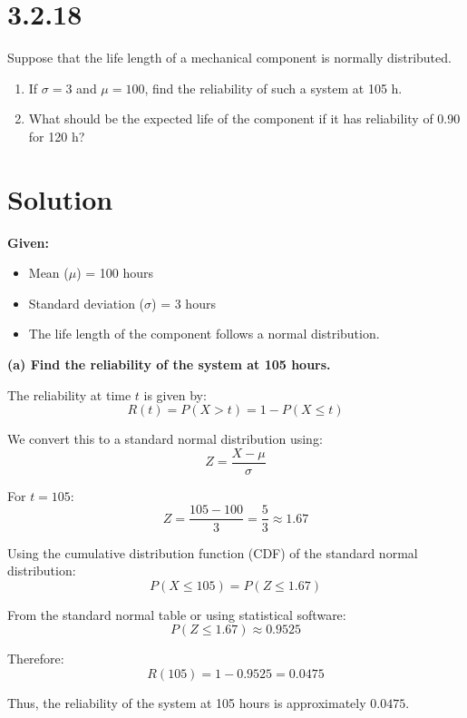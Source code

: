 \documentclass{article}
\begin{document}
\section*{3.2.18}

Suppose that the life length of a mechanical component is normally distributed.

\begin{enumerate}
    \item[(a)] If \(\sigma = 3\) and \(\mu = 100\), find the reliability of such a system at 105 h.
    
    \item[(b)] What should be the expected life of the component if it has reliability of 0.90 for 120 h?
\end{enumerate}

\section*{Solution}

\textbf{Given:}
\begin{itemize}
    \item Mean (\(\mu\)) = 100 hours
    \item Standard deviation (\(\sigma\)) = 3 hours
    \item The life length of the component follows a normal distribution.
\end{itemize}

\vspace{3mm} %

\textbf{\large(a) Find the reliability of the system at 105 hours.\newline}

The reliability at time \(t\) is given by:
\[
R(t) = P(X > t) = 1 - P(X \leq t)
\]

We convert this to a standard normal distribution using:
\[
Z = \frac{X - \mu}{\sigma}
\]

For \(t = 105\):
\[
Z = \frac{105 - 100}{3} = \frac{5}{3} \approx 1.67
\]

Using the cumulative distribution function (CDF) of the standard normal distribution:
\[
P(X \leq 105) = P(Z \leq 1.67)
\]

From the standard normal table or using statistical software:
\[
P(Z \leq 1.67) \approx 0.9525
\]

Therefore:
\[
R(105) = 1 - 0.9525 = 0.0475
\]

Thus, the reliability of the system at 105 hours is approximately \(0.0475\).\newline
\end{document}
